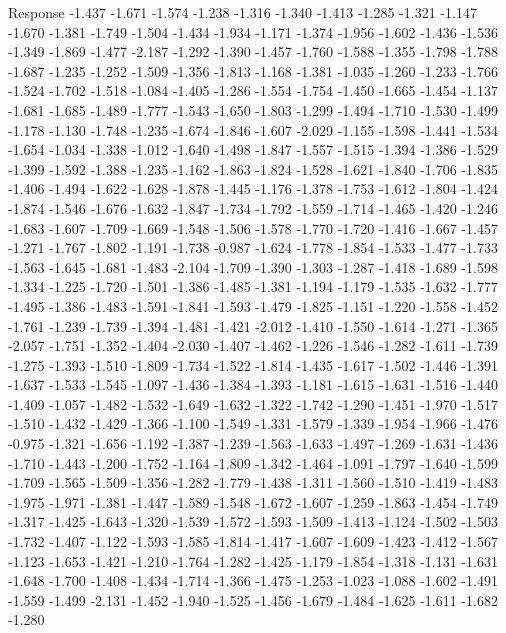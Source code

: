 \documentclass[9pt]{article}
\theoremstyle{plain}
\theoremstyle{definition}
\theoremstyle{remark}
\numberwithin{equation}{section}
\begin{document}
Response
-1.437
-1.671
-1.574
-1.238
-1.316
-1.340
-1.413
-1.285
-1.321
-1.147
-1.670
-1.381
-1.749
-1.504
-1.434
-1.934
-1.171
-1.374
-1.956
-1.602
-1.436
-1.536
-1.349
-1.869
-1.477
-2.187
-1.292
-1.390
-1.457
-1.760
-1.588
-1.355
-1.798
-1.788
-1.687
-1.235
-1.252
-1.509
-1.356
-1.813
-1.168
-1.381
-1.035
-1.260
-1.233
-1.766
-1.524
-1.702
-1.518
-1.084
-1.405
-1.286
-1.554
-1.754
-1.450
-1.665
-1.454
-1.137
-1.681
-1.685
-1.489
-1.777
-1.543
-1.650
-1.803
-1.299
-1.494
-1.710
-1.530
-1.499
-1.178
-1.130
-1.748
-1.235
-1.674
-1.846
-1.607
-2.029
-1.155
-1.598
-1.441
-1.534
-1.654
-1.034
-1.338
-1.012
-1.640
-1.498
-1.847
-1.557
-1.515
-1.394
-1.386
-1.529
-1.399
-1.592
-1.388
-1.235
-1.162
-1.863
-1.824
-1.528
-1.621
-1.840
-1.706
-1.835
-1.406
-1.494
-1.622
-1.628
-1.878
-1.445
-1.176
-1.378
-1.753
-1.612
-1.804
-1.424
-1.874
-1.546
-1.676
-1.632
-1.847
-1.734
-1.792
-1.559
-1.714
-1.465
-1.420
-1.246
-1.683
-1.607
-1.709
-1.669
-1.548
-1.506
-1.578
-1.770
-1.720
-1.416
-1.667
-1.457
-1.271
-1.767
-1.802
-1.191
-1.738
-0.987
-1.624
-1.778
-1.854
-1.533
-1.477
-1.733
-1.563
-1.645
-1.681
-1.483
-2.104
-1.709
-1.390
-1.303
-1.287
-1.418
-1.689
-1.598
-1.334
-1.225
-1.720
-1.501
-1.386
-1.485
-1.381
-1.194
-1.179
-1.535
-1.632
-1.777
-1.495
-1.386
-1.483
-1.591
-1.841
-1.593
-1.479
-1.825
-1.151
-1.220
-1.558
-1.452
-1.761
-1.239
-1.739
-1.394
-1.481
-1.421
-2.012
-1.410
-1.550
-1.614
-1.271
-1.365
-2.057
-1.751
-1.352
-1.404
-2.030
-1.407
-1.462
-1.226
-1.546
-1.282
-1.611
-1.739
-1.275
-1.393
-1.510
-1.809
-1.734
-1.522
-1.814
-1.435
-1.617
-1.502
-1.446
-1.391
-1.637
-1.533
-1.545
-1.097
-1.436
-1.384
-1.393
-1.181
-1.615
-1.631
-1.516
-1.440
-1.409
-1.057
-1.482
-1.532
-1.649
-1.632
-1.322
-1.742
-1.290
-1.451
-1.970
-1.517
-1.510
-1.432
-1.429
-1.366
-1.100
-1.549
-1.331
-1.579
-1.339
-1.954
-1.966
-1.476
-0.975
-1.321
-1.656
-1.192
-1.387
-1.239
-1.563
-1.633
-1.497
-1.269
-1.631
-1.436
-1.710
-1.443
-1.200
-1.752
-1.164
-1.809
-1.342
-1.464
-1.091
-1.797
-1.640
-1.599
-1.709
-1.565
-1.509
-1.356
-1.282
-1.779
-1.438
-1.311
-1.560
-1.510
-1.419
-1.483
-1.975
-1.971
-1.381
-1.447
-1.589
-1.548
-1.672
-1.607
-1.259
-1.863
-1.454
-1.749
-1.317
-1.425
-1.643
-1.320
-1.539
-1.572
-1.593
-1.509
-1.413
-1.124
-1.502
-1.503
-1.732
-1.407
-1.122
-1.593
-1.585
-1.814
-1.417
-1.607
-1.609
-1.423
-1.412
-1.567
-1.123
-1.653
-1.421
-1.210
-1.764
-1.282
-1.425
-1.179
-1.854
-1.318
-1.131
-1.631
-1.648
-1.700
-1.408
-1.434
-1.714
-1.366
-1.475
-1.253
-1.023
-1.088
-1.602
-1.491
-1.559
-1.499
-2.131
-1.452
-1.940
-1.525
-1.456
-1.679
-1.484
-1.625
-1.611
-1.682
-1.280
\end{document}
